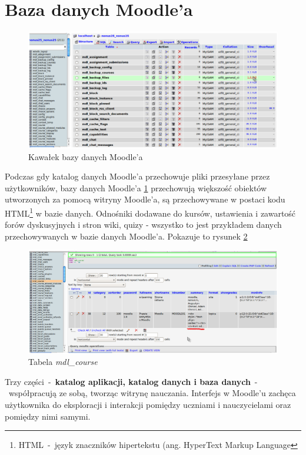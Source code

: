 \section{Baza danych Moodle'a} \label{roz:baza_dnaych}
\begin{figure}[!ht]
	\centering
		\caption{Kawałek bazy danych Moodle'a} \label{rys:baza}
		\includegraphics[width=1\textwidth]{char_narzarzedzi//rys//baza.eps}
\end{figure}
Podczas gdy katalog danych Moodle'a przechowuje pliki przesyłane przez użytkowników, bazy danych Moodle'a \ref{rys:baza} przechowują większość obiektów utworzonych za pomocą witryny Moodle'a, są przechowywane w postaci kodu HTML\footnote{HTML~-~język znaczników hipertekstu (ang. HyperText Markup Language} w bazie danych. Odnośniki dodawane do kursów, ustawienia i zawartość forów dyskusyjnych i stron wiki, quizy - wszystko to jest przykładem danych przechowywanych w bazie danych Moodle'a. Pokazuje to rysunek \ref{rys:tabela} \\
\begin{figure}[!hb]
	\centering
		\caption{Tabela \textit{mdl\_course}} \label{rys:tabela}
		\includegraphics[width=1\textwidth]{char_narzarzedzi//rys//course.eps}
\end{figure}
Trzy części~-~\textbf{katalog aplikacji, katalog danych i baza danych}~-~współpracują ze sobą, tworząc witrynę nauczania. Interfejs w Moodle'u zachęca użytkownika do eksploracji i interakcji pomiędzy uczniami i nauczycielami oraz pomiędzy nimi samymi.\\
